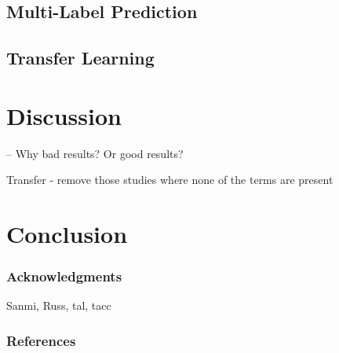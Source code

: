 \documentclass{article} %
\begin{document}
 \subsection{Multi-Label Prediction}
 \subsection{Transfer Learning}

\section{Discussion}
-- Why bad results? Or good results?

Transfer - remove those studies where none of the terms are present

\section{Conclusion}

\subsubsection*{Acknowledgments}
Sanmi, Russ, tal, tacc

\subsubsection*{References}

\nocite{*}

\end{document}
